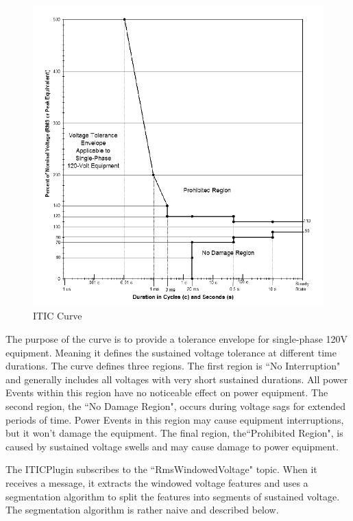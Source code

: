 \begin{figure}
	\centering
	\includegraphics[width=\linewidth]{figures/itic.png}
	\caption{ITIC Curve}
	\label{fig:IticCurve}
\end{figure}

The purpose of the curve is to provide a tolerance envelope for single-phase 120V equipment. Meaning it defines the sustained voltage tolerance at different time durations. The curve defines three regions. The first region is ``No Interruption" and generally includes all voltages with very short sustained durations. All power Events within this region have no noticeable effect on power equipment. The second region, the ``No Damage Region", occurs during voltage sags for extended periods of time. Power Events in this region may cause equipment interruptions, but it won't damage the equipment. The final region, the``Prohibited Region", is caused by sustained voltage swells and may cause damage to power equipment.

The ITICPlugin subscribes to the ``RmsWindowedVoltage" topic. When it receives a message, it extracts the windowed voltage features and uses a segmentation algorithm to split the features into segments of sustained voltage. The segmentation algorithm is rather naive and described below.

